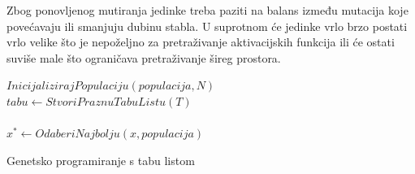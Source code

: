 \documentclass[times, utf8, numeric, diplomski]{fer}
\begin{document}
Zbog ponovljenog mutiranja jedinke treba paziti na balans između mutacija koje povećavaju ili smanjuju dubinu stabla. U suprotnom će jedinke vrlo brzo postati vrlo velike što je nepoželjno za pretraživanje aktivacijskih funkcija \citep{swish} ili će ostati suviše male što ograničava pretraživanje šireg prostora.

\begin{algorithm}[H]
\begin{algorithmic}
$InicijalizirajPopulaciju(populacija, N)$ \\
$tabu \gets StvoriPraznuTabuListu(T)$ \\
  \ENDWHILE \\
$x^* \gets OdaberiNajbolju(x, populacija)$ \\
\end{algorithmic}
\caption{Genetsko programiranje s tabu listom}
\label{alg:gp_taboo}
\end{algorithm}
\end{document}
